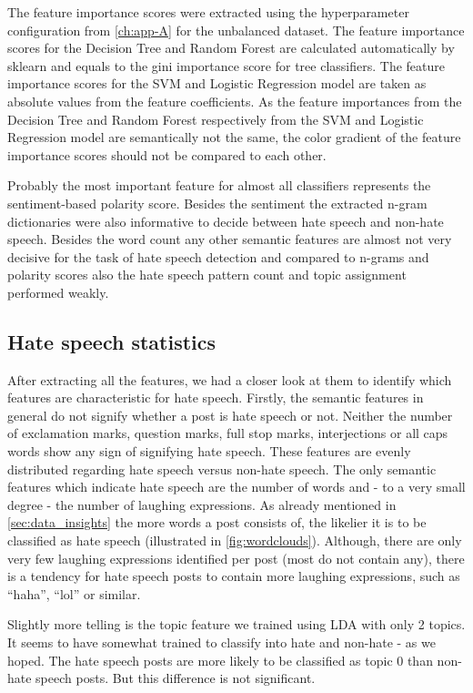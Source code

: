 The feature importance scores were extracted using the hyperparameter configuration from \ref{ch:app-A} for the unbalanced dataset. The feature importance scores for the Decision Tree and Random Forest are calculated automatically by sklearn and equals to the gini importance score for tree classifiers. The feature importance scores for the SVM and Logistic Regression model are taken as absolute values from the feature coefficients. As the feature importances from the Decision Tree and Random Forest respectively from the SVM and Logistic Regression model are semantically not the same, the color gradient of the feature importance scores should not be compared to each other.

Probably the most important feature for almost all classifiers represents the sentiment-based polarity score. Besides the sentiment the extracted n-gram dictionaries were also informative to decide between hate speech and non-hate speech. Besides the word count any other semantic features are almost not very decisive for the task of hate speech detection and compared to n-grams and polarity scores also the hate speech pattern count and topic assignment performed weakly. 

\subsection{Hate speech statistics}
\label{ch:experimentDb}

After extracting all the features, we had a closer look at them to identify which features are characteristic for hate speech.
Firstly, the semantic features in general do not signify whether a post is hate speech or not. Neither the number of exclamation marks, question marks, full stop marks, interjections or all caps words show any sign of signifying hate speech. These features are evenly distributed regarding hate speech versus non-hate speech.
The only semantic features which indicate hate speech are the number of words and - to a very small degree - the number of laughing expressions.
As already mentioned in \autoref{sec:data_insights} the more words a post consists of, the likelier it is to be classified as hate speech (illustrated in \autoref{fig:wordclouds}).
Although, there are only very few laughing expressions identified per post (most do not contain any), there is a tendency for hate speech posts to contain more laughing expressions, such as \enquote{haha}, \enquote{lol} or similar.

Slightly more telling is the topic feature we trained using LDA with only 2 topics. It seems to have somewhat trained to classify into hate and non-hate - as we hoped. The hate speech posts are more likely to be classified as topic 0 than non-hate speech posts. But this difference is not significant.

